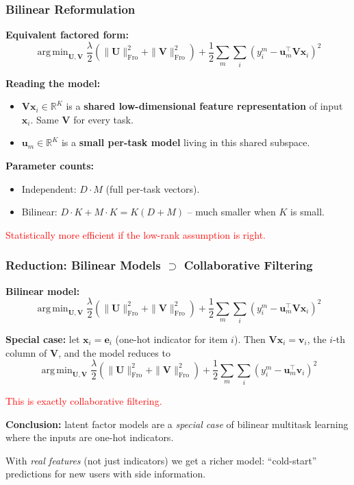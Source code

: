 \documentclass[notes,11pt, aspectratio=169]{beamer}
\DeclareMathOperator*{\argmin}{arg\,min}
\newcommand{\vx}{\mathbf{x}}
\newcommand{\vu}{\mathbf{u}}
\newcommand{\vv}{\mathbf{v}}
\newcommand{\vU}{\mathbf{U}}
\newcommand{\vV}{\mathbf{V}}
\newcommand{\R}{\mathbb{R}}
\newcommand{\Frob}{\mathrm{Fro}}
\begin{document}
\begin{frame}
\frametitle{Bilinear Reformulation}

\textbf{Equivalent factored form:}
\[
    \argmin_{\vU, \vV} \frac{\lambda}{2}(\|\vU\|_\Frob^2 + \|\vV\|_\Frob^2) + \frac{1}{2} \sum_m \sum_i (y_i^m - \vu_m^\top \vV \vx_i)^2
\]

\vspace{6pt}
\textbf{Reading the model:}
\begin{itemize}
    \item $\vV \vx_i \in \R^K$ is a \textbf{shared low-dimensional feature representation} of input $\vx_i$. Same $\vV$ for every task.
    \item $\vu_m \in \R^K$ is a \textbf{small per-task model} living in this shared subspace.
\end{itemize}

\vspace{8pt}
\textbf{Parameter counts:}
\begin{itemize}
    \item Independent: $D \cdot M$ (full per-task vectors).
    \item Bilinear: $D \cdot K + M \cdot K = K(D + M)$ -- much smaller when $K$ is small.
\end{itemize}

\vspace{4pt}
\textcolor{red}{Statistically more efficient if the low-rank assumption is right.}
\end{frame}

\begin{frame}
\frametitle{Reduction: Bilinear Models $\supset$ Collaborative Filtering}

\textbf{Bilinear model:}
\[
    \argmin_{\vU, \vV} \frac{\lambda}{2}(\|\vU\|_\Frob^2 + \|\vV\|_\Frob^2) + \frac{1}{2} \sum_m \sum_i (y_i^m - \vu_m^\top \vV \vx_i)^2
\]

\vspace{6pt}
\textbf{Special case:} let $\vx_i = \mathbf{e}_i$ (one-hot indicator for item $i$). Then $\vV \vx_i = \vv_i$, the $i$-th column of $\vV$, and the model reduces to
\[
    \argmin_{\vU, \vV} \frac{\lambda}{2}(\|\vU\|_\Frob^2 + \|\vV\|_\Frob^2) + \frac{1}{2} \sum_m \sum_i (y_i^m - \vu_m^\top \vv_i)^2
\]

\vspace{4pt}
\textcolor{red}{This is exactly collaborative filtering.}

\vspace{8pt}
\textbf{Conclusion:} latent factor models are a \emph{special case} of bilinear multitask learning where the inputs are one-hot indicators.

\vspace{4pt}
With \emph{real features} (not just indicators) we get a richer model: ``cold-start'' predictions for new users with side information.
\end{frame}
\end{document}
